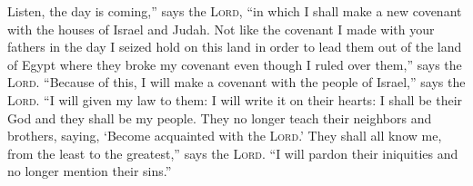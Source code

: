 
\begin{inparaenum}
  
  
  
  
  
  
  
  
   Listen, the day is coming,'' says the \textsc{Lord}, ``in which I shall make a new covenant with the houses of Israel and Judah.%
   Not like the covenant I made with your fathers in the day I seized hold on this land in order to lead them out of the land of Egypt where they broke my covenant even though I ruled over them,'' says the \textsc{Lord}.%
   ``Because of this, I will make a covenant with the people of Israel,'' says the \textsc{Lord}. ``I will given my law to them: I will write it on their hearts: I shall be their God and they shall be my people.%
   They no longer teach their neighbors and brothers, saying, `Become acquainted with the \textsc{Lord}.' They shall all know me, from the least to the greatest,'' says the \textsc{Lord}. ``I will pardon their iniquities and no longer mention their sins.''%
  
  
  
\end{inparaenum}
